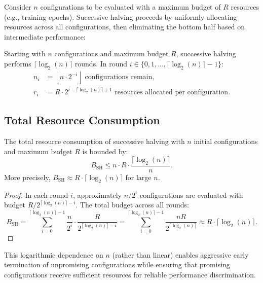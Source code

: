 Consider $n$ configurations to be evaluated with a maximum budget of $R$ resources (e.g., training epochs). Successive halving proceeds by uniformly allocating resources across all configurations, then eliminating the bottom half based on intermediate performance:

\begin{definition}
Starting with $n$ configurations and maximum budget $R$, successive halving performs $\lceil \log_2(n) \rceil$ rounds. In round $i \in \{0, 1, \ldots, \lceil \log_2(n) \rceil - 1\}$:
\begin{align}
n_i &= \left\lfloor n \cdot 2^{-i} \right\rfloor \text{ configurations remain}, \\
r_i &= R \cdot 2^{i - \lceil \log_2(n) \rceil + 1} \text{ resources allocated per configuration}.
\end{align}
\end{definition}

\subsection{Total Resource Consumption}

\begin{proposition}
\label{prop:sh_budget}
The total resource consumption of successive halving with $n$ initial configurations and maximum budget $R$ is bounded by:
\begin{equation}
B_{\text{SH}} \leq n \cdot R \cdot \frac{\lceil \log_2(n) \rceil}{n}.
\end{equation}
More precisely, $B_{\text{SH}} \approx R \cdot \lceil \log_2(n) \rceil$ for large $n$.
\end{proposition}

\begin{proof}
In each round $i$, approximately $n/2^i$ configurations are evaluated with budget $R/2^{\lceil \log_2(n) \rceil - i}$. The total budget across all rounds:
\begin{equation}
B_{\text{SH}} = \sum_{i=0}^{\lceil \log_2(n) \rceil - 1} \frac{n}{2^i} \cdot \frac{R}{2^{\lceil \log_2(n) \rceil - i}} = \sum_{i=0}^{\lceil \log_2(n) \rceil - 1} \frac{nR}{2^{\lceil \log_2(n) \rceil}} \approx R \cdot \lceil \log_2(n) \rceil.
\end{equation}
\end{proof}

This logarithmic dependence on $n$ (rather than linear) enables aggressive early termination of unpromising configurations while ensuring that promising configurations receive sufficient resources for reliable performance discrimination.

